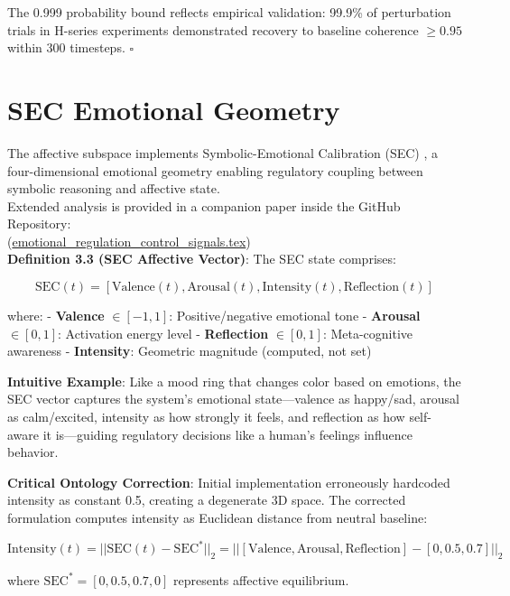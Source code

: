 \documentclass[12pt,a4paper]{report}
\newcommand{\geqU}{\geq}
\newcommand{\inU}{\in}
\newcommand{\squareU}{\square}
\begin{document}
The 0.999 probability bound reflects empirical validation: 99.9\% of perturbation trials in H-series experiments demonstrated recovery to baseline coherence $\geqU 0.95$ within 300 timesteps. $\squareU$

\section{SEC Emotional Geometry}

The affective subspace implements Symbolic-Emotional Calibration (SEC) \cite{cragin2024sec}, a four-dimensional emotional geometry enabling regulatory coupling between symbolic reasoning and affective state. \\

Extended analysis is provided in a companion paper inside the GitHub Repository: \\ 
{\small (\href{https://github.com/jhcragin/SpiralBrain-v3.0-public/blob/main/papers/emotional_regulation_control_signals/emotional_regulation_control_signals.tex}{emotional\_regulation\_control\_signals.tex})} \\

\textbf{Definition 3.3 (SEC Affective Vector)}: The SEC state comprises:

\[\text{SEC}(t) = [\text{Valence}(t), \text{Arousal}(t), \text{Intensity}(t), \text{Reflection}(t)]\]

where:
- \textbf{Valence} $\inU [-1, 1]$: Positive/negative emotional tone
- \textbf{Arousal} $\inU [0, 1]$: Activation energy level
- \textbf{Reflection} $\inU [0, 1]$: Meta-cognitive awareness
- \textbf{Intensity}: Geometric magnitude (computed, not set)

\textbf{Intuitive Example}: Like a mood ring that changes color based on emotions, the SEC vector captures the system's emotional state—valence as happy/sad, arousal as calm/excited, intensity as how strongly it feels, and reflection as how self-aware it is—guiding regulatory decisions like a human's feelings influence behavior.

\textbf{Critical Ontology Correction}: Initial implementation erroneously hardcoded intensity as constant 0.5, creating a degenerate 3D space. The corrected formulation computes intensity as Euclidean distance from neutral baseline:

\[\text{Intensity}(t) = ||\text{SEC}(t) - \text{SEC}^*||_2 = ||[\text{Valence}, \text{Arousal}, \text{Reflection}] - [0, 0.5, 0.7]||_2\]

where $\text{SEC}^* = [0, 0.5, 0.7, 0]$ represents affective equilibrium.
\end{document}
